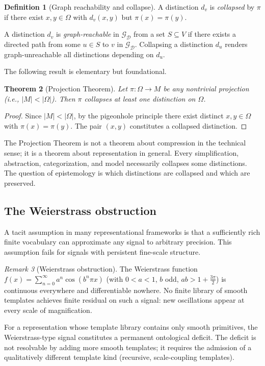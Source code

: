 \documentclass[11pt, a4paper]{article}
\theoremstyle{plain}
\newtheorem{theorem}{Theorem}[section]
\theoremstyle{definition}
\newtheorem{definition}[theorem]{Definition}
\theoremstyle{remark}
\newtheorem{remark}[theorem]{Remark}
\newcommand{\Dist}{\mathcal{D}}
\newcommand{\Proj}{\pi}
\newcommand{\DG}{\mathcal{G}_{\Dist}}
\begin{document}
\begin{definition}[Graph reachability and collapse]
\label{def:collapse}
A distinction $d_v$ is \emph{collapsed} by $\Proj$ if there exist
$x, y \in \Omega$ with $d_v(x,y)$ but $\Proj(x) = \Proj(y)$.

A distinction $d_v$ is \emph{graph-reachable} in $\DG$ from a set
$S \subseteq V$ if there exists a directed path from some $u \in S$
to $v$ in $\DG$. Collapsing a distinction $d_u$ renders
graph-unreachable all distinctions depending on $d_u$.
\end{definition}

The following result is elementary but foundational.

\begin{theorem}[Projection Theorem]
\label{thm:projection}
Let $\Proj : \Omega \to M$ be any nontrivial projection
(i.e., $|M| < |\Omega|$). Then $\Proj$ collapses at least one
distinction on $\Omega$.
\end{theorem}

\begin{proof}
Since $|M| < |\Omega|$, by the pigeonhole principle there exist
distinct $x, y \in \Omega$ with $\Proj(x) = \Proj(y)$.
The pair $(x,y)$ constitutes a collapsed distinction.
\end{proof}

The Projection Theorem is not a theorem about compression
in the technical sense; it is a theorem about representation in general.
Every simplification, abstraction, categorization, and model
necessarily collapses some distinctions. The question of epistemology
is which distinctions are collapsed and which are preserved.

\subsection{The Weierstrass obstruction}

A tacit assumption in many representational frameworks is that
a sufficiently rich finite vocabulary can approximate any signal
to arbitrary precision. This assumption fails for signals with
persistent fine-scale structure.

\begin{remark}[Weierstrass obstruction]
\label{rem:weierstrass}
The Weierstrass function $f(x) = \sum_{n=0}^\infty a^n \cos(b^n \pi x)$
(with $0 < a < 1$, $b$ odd, $ab > 1 + \frac{3\pi}{2}$) is continuous
everywhere and differentiable nowhere. No finite library of smooth
templates achieves finite residual on such a signal: new oscillations
appear at every scale of magnification.

For a representation whose template library contains only smooth
primitives, the Weierstrass-type signal constitutes a permanent
ontological deficit. The deficit is not resolvable by adding more
smooth templates; it requires the admission of a qualitatively
different template kind (recursive, scale-coupling templates).
\end{remark}
\end{document}

